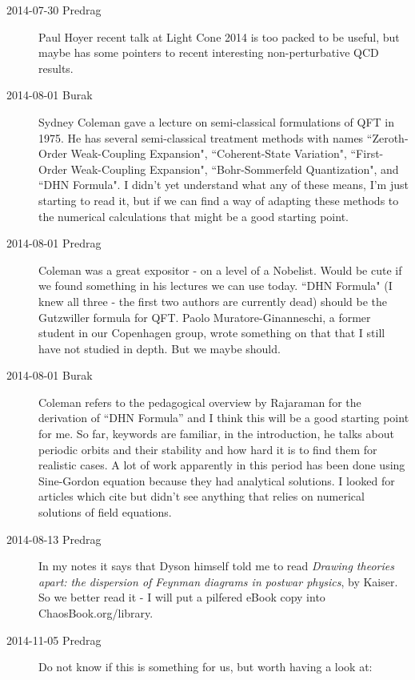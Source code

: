 \begin{description}
\item[2014-07-30 Predrag]
Paul Hoyer recent talk at
{Light Cone 2014} is too packed to be useful, but maybe has some pointers
to recent interesting non-perturbative QCD results.

\item[2014-08-01 Burak]
Sydney Coleman gave a lecture on semi-classical formulations of QFT in 1975.
He has several semi-classical treatment methods with names
``Zeroth-Order Weak-Coupling Expansion",
``Coherent-State Variation",
``First-Order Weak-Coupling Expansion",
``Bohr-Sommerfeld Quantization", and
``DHN Formula". I didn't yet understand what any of these means, I'm just starting
to read it, but if we can find a way of adapting these methods to the numerical
calculations that might be a good starting point.

\item[2014-08-01 Predrag]
Coleman was a great expositor - on a level of a Nobelist. Would be cute
if we found something in his lectures we can use today. ``DHN Formula" (I
knew all three - the first two authors are currently dead) should be the
Gutzwiller formula for QFT. Paolo Muratore-Ginanneschi, a former student
in our Copenhagen group, wrote something on that that I still
have not studied in depth. But we maybe should.

\item[2014-08-01 Burak]
Coleman refers to the pedagogical overview by Rajaraman  for the derivation
of ``DHN Formula'' and I think this will be a good starting point for me. So far,
keywords are familiar, in the introduction, he talks about periodic orbits and
their stability and how hard it is to find them for realistic cases. A lot of work
apparently in this period has been done using Sine-Gordon equation because they
had analytical solutions. I looked for articles which cite  but didn't
see anything that relies on numerical solutions of field equations.

\item[2014-08-13 Predrag]
In my notes it says that Dyson himself told me to read {\em Drawing
theories apart: the dispersion of {Feynman} diagrams in postwar physics},
by Kaiser. So we better read it - I will put a pilfered
eBook copy 
into ChaosBook.org/library.

\item[2014-11-05 Predrag]
Do not know if this is something for us, but worth having a look at:


\end{description}
